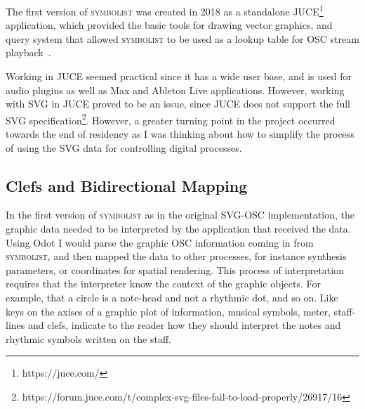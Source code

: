 \documentclass{article}
\def\symbolist{\textsc{symbolist}\xspace}
\begin{document}
The first version of \symbolist was created in 2018 as a standalone JUCE\footnote{https://juce.com/} application, which provided the basic tools for drawing vector graphics, and query system that allowed \symbolist to be used as a lookup table for OSC stream playback~\cite{gottfried2018symbolist}.

Working in JUCE seemed practical since it has a wide user base, and is used for audio plugins as well as Max and Ableton Live applications. However, working with SVG in JUCE proved to be an issue, since JUCE does not support the full SVG specification\footnote{https://forum.juce.com/t/complex-svg-files-fail-to-load-properly/26917/16}. However, a greater turning point in the project occurred towards the end of residency as I was thinking about how to simplify the process of using the SVG data for controlling digital processes.

\subsection*{Clefs and Bidirectional Mapping}\label{sec:bidirectional_mapping}

In the first version of \symbolist as in the original SVG-OSC implementation, the graphic data needed to be interpreted by the application that received the data. Using Odot I would parse the graphic OSC information coming in from \symbolist, and then mapped the data to other processes, for instance synthesis parameters, or coordinates for spatial rendering. This process of interpretation requires that the interpreter know the context of the graphic objects. For example, that a circle is a note-head and not a rhythmic dot, and so on. Like keys on the axises of a graphic plot of information, musical symbols, meter, staff-lines and clefs, indicate to the reader how they should interpret the notes and rhythmic symbols written on the staff.
\end{document}
